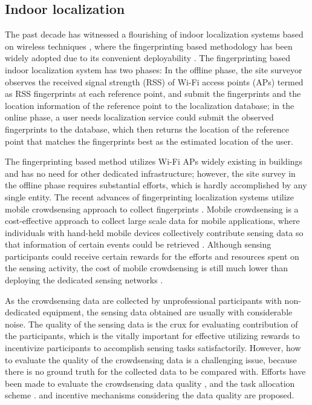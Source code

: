 \documentclass[10pt,conference,compsocconf,letterpaper]{IEEEtran}
\begin{document}
\subsection{Indoor localization}
The past decade has witnessed a flourishing of indoor localization systems based on wireless techniques \cite{ rsscsi}, where the fingerprinting based methodology has been widely adopted due to its convenient deployability \cite{ mobicom04, horus }. The fingerprinting based indoor localization system has two phases: In the offline phase, the site surveyor observes the received signal strength (RSS) of Wi-Fi access points (APs) termed as RSS fingerprints at each reference point, and submit the fingerprints and the location information of the reference point to the localization database; in the online phase, a user needs localization service could submit the observed fingerprints to the database, which then returns the location of the reference point that matches the fingerprints best as the estimated location of the user.

The fingerprinting based method utilizes Wi-Fi APs widely existing in buildings and has no need for other dedicated infrastructure; however, the site survey in the offline phase requires substantial efforts, which is hardly accomplished by any single entity. The recent advances of fingerprinting localization systems utilize mobile crowdsensing approach to collect fingerprints \cite{ wen2015fundamental, Chenshu14, luo2014piloc, shen2013walkie, ez10, Chintalapudi10}. Mobile crowdsensing is a cost-effective approach to collect large scale data for mobile applications, where individuals with hand-held mobile devices collectively contribute sensing data so that information of certain events could be retrieved \cite{ganti2011mobile, han2016posted}. Although sensing participants could receive certain rewards for the efforts and resources spent on the sensing activity, the cost of mobile crowdsensing is still much lower than deploying the dedicated sensing networks \cite{ganti2011mobile}.

As the crowdsensing data are collected by unprofessional participants with non-dedicated equipment, the sensing data obtained are usually with considerable noise. The quality of the sensing data is the crux for evaluating contribution of the participants, which is the vitally important for effective utilizing rewards to incentivize participants to accomplish sensing tasks satisfactorily. However, how to evaluate the quality of the crowdsensing data is a challenging issue, because there is no ground truth for the collected data to be compared with. Efforts have been made to evaluate the crowdsensing data quality \cite{kawajiri2014steered}, and the task allocation scheme \cite{ cheung2015distributed, reddy2010recruitment}. and incentive mechanisms considering the data quality are proposed.
\end{document}
